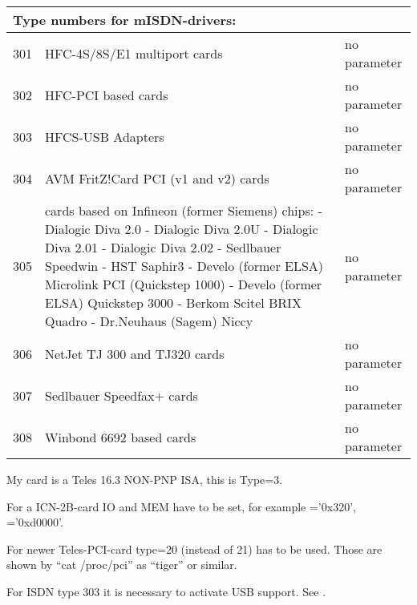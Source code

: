 \begin{description}
\begin{small}
\begin{longtable}{|r|p{60mm}|p{62mm}|}
    \hline\hline
    \multicolumn{3}{|l|}{Type numbers for mISDN-drivers:} \\
    \hline

    301 & HFC-4S/8S/E1 multiport cards         & no parameter \\
    302 & HFC-PCI based cards                  & no parameter \\
    303 & HFCS-USB Adapters                    & no parameter \\
    304 & AVM FritZ!Card PCI (v1 and v2) cards & no parameter \\
    305 & cards based on Infineon (former Siemens) chips: \newline
          - Dialogic Diva 2.0 \newline
          - Dialogic Diva 2.0U \newline
          - Dialogic Diva 2.01 \newline
          - Dialogic Diva 2.02 \newline
          - Sedlbauer Speedwin \newline
          - HST Saphir3 \newline
          - Develo (former ELSA) Microlink PCI (Quickstep 1000) \newline
          - Develo (former ELSA) Quickstep 3000 \newline
          - Berkom Scitel BRIX Quadro \newline
          - Dr.Neuhaus (Sagem) Niccy           & no parameter \\
    306 & NetJet TJ 300 and TJ320 cards        & no parameter \\
    307 & Sedlbauer Speedfax+ cards            & no parameter \\
    308 & Winbond 6692 based cards             & no parameter \\
    \hline
  \end{longtable}
\end{small}
  
  My card is a Teles 16.3 NON-PNP ISA, this is Type=3.

  For a ICN-2B-card IO and MEM have to be set, for example 
  ='0x320', ='0xd0000'.

  For newer Teles-PCI-card type=20 (instead of 21) has to be used. 
  Those are shown by ``cat /proc/pci'' as ``tiger'' or similar. 
  
  For ISDN type 303 it is necessary to activate USB support. 
  See .\\


\end{description}
